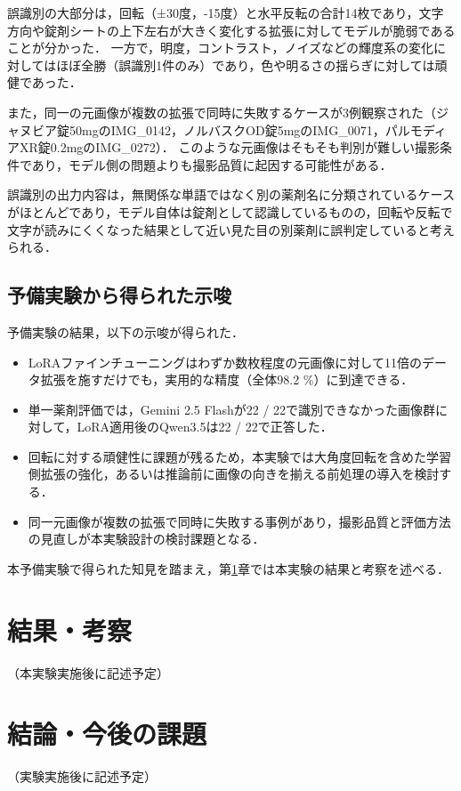 \documentclass{ltjsarticle}
\begin{document}
誤識別の大部分は，回転（±30度，-15度）と水平反転の合計14枚であり，文字方向や錠剤シートの上下左右が大きく変化する拡張に対してモデルが脆弱であることが分かった．
一方で，明度，コントラスト，ノイズなどの輝度系の変化に対してはほぼ全勝（誤識別1件のみ）であり，色や明るさの揺らぎに対しては頑健であった．

また，同一の元画像が複数の拡張で同時に失敗するケースが3例観察された（ジャヌビア錠50mgのIMG\_0142，ノルバスクOD錠5mgのIMG\_0071，パルモディアXR錠0.2mgのIMG\_0272）．
このような元画像はそもそも判別が難しい撮影条件であり，モデル側の問題よりも撮影品質に起因する可能性がある．

誤識別の出力内容は，無関係な単語ではなく別の薬剤名に分類されているケースがほとんどであり，モデル自体は錠剤として認識しているものの，回転や反転で文字が読みにくくなった結果として近い見た目の別薬剤に誤判定していると考えられる．

\subsection{予備実験から得られた示唆}

予備実験の結果，以下の示唆が得られた．

\begin{itemize}
  \item LoRAファインチューニングはわずか数枚程度の元画像に対して11倍のデータ拡張を施すだけでも，実用的な精度（全体98.2 \%）に到達できる．
  \item 単一薬剤評価では，Gemini 2.5 Flashが22 / 22で識別できなかった画像群に対して，LoRA適用後のQwen3.5は22 / 22で正答した．
  \item 回転に対する頑健性に課題が残るため，本実験では大角度回転を含めた学習側拡張の強化，あるいは推論前に画像の向きを揃える前処理の導入を検討する．
  \item 同一元画像が複数の拡張で同時に失敗する事例があり，撮影品質と評価方法の見直しが本実験設計の検討課題となる．
\end{itemize}

本予備実験で得られた知見を踏まえ，第\ref{sec5}章では本実験の結果と考察を述べる．

\newpage

\section{結果・考察}\label{sec5}

（本実験実施後に記述予定）

\newpage

\section{結論・今後の課題}\label{sec6}

（実験実施後に記述予定）

\newpage

\nocite{*}


\end{document}
